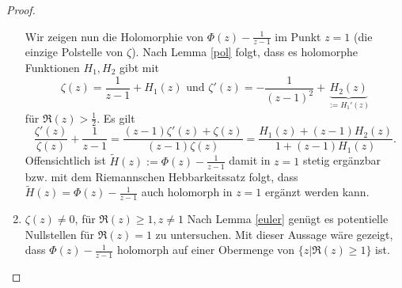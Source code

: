 \documentclass{mywork}
\begin{document}
\begin{proof}
\begin{enumerate}[1)]
Wir zeigen nun die Holomorphie von $ \Phi(z)-\frac{1}{z-1} $ im Punkt $ z=1 $ (die einzige Polstelle von $ \zeta $). Nach Lemma \ref{pol} folgt, dass es holomorphe Funktionen $ H_1, H_2 $ gibt mit 
\[
\zeta(z)=\frac{1}{z-1}+ H_1(z) \text{ und } \zeta'(z)=- \frac{1}{(z-1)^2}+ \underbrace{H_2(z)}_{:=H_1'(z)}
\]
für $ \Re(z)>\frac{1}{2} $. Es gilt
\[
\frac{\zeta'(z)}{\zeta(z)}+ \frac{1}{z-1}= \frac{(z-1) \zeta'(z)+\zeta(z)}{(z-1)\zeta(z)}= \frac{H_1(z)+(z-1)H_2(z)}{1+(z-1) H_1(z)}.
\]
Offensichtlich ist $\tilde H(z):= \Phi(z) - \frac{1}{z-1} $ damit in $ z=1 $ stetig ergänzbar bzw. mit dem Riemannschen Hebbarkeitssatz folgt, dass $ \tilde H(z)= \Phi(z) - \frac{1}{z-1} $ auch holomorph in $ z=1 $ ergänzt werden kann. %
\item $ \zeta(z)\neq 0 $, für $ \Re(z)\ge 1, z\neq 1 $
Nach Lemma \ref{euler} genügt es potentielle Nullstellen für $ \Re(z)=1 $ zu untersuchen.
Mit dieser Aussage wäre gezeigt, dass $ \Phi(z)-\frac{1}{z-1} $ holomorph auf einer Obermenge von $ \{z| \Re(z) \ge 1\} $ ist.


\end{enumerate}
\end{proof}
\end{document}
